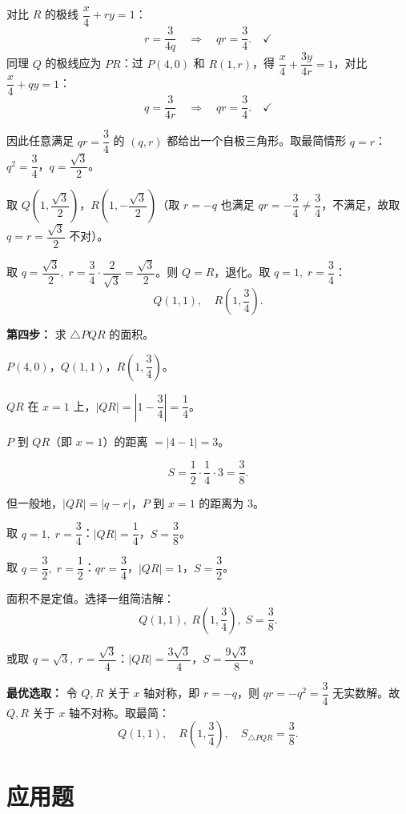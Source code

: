 \documentclass[12pt,a4paper]{ctexart}
\theoremstyle{definition}
\begin{document}
\begin{solutionbox}
对比 $R$ 的极线 $\dfrac{x}{4}+ry=1$：
\[
  r=\frac{3}{4q} \quad\Longrightarrow\quad qr=\frac{3}{4}. \quad\checkmark
\]
同理 $Q$ 的极线应为 $PR$：过 $P(4,0)$ 和 $R(1,r)$，得 $\dfrac{x}{4}+\dfrac{3y}{4r}=1$，对比 $\dfrac{x}{4}+qy=1$：
\[
  q=\frac{3}{4r} \quad\Longrightarrow\quad qr=\frac{3}{4}. \quad\checkmark
\]

因此任意满足 $qr=\dfrac{3}{4}$ 的 $(q,r)$ 都给出一个自极三角形。取最简情形 $q=r$：$q^2=\dfrac{3}{4}$，$q=\dfrac{\sqrt{3}}{2}$。

取 $Q\!\left(1,\dfrac{\sqrt{3}}{2}\right)$，$R\!\left(1,-\dfrac{\sqrt{3}}{2}\right)$（取 $r=-q$ 也满足 $qr=-\dfrac{3}{4}\neq\dfrac{3}{4}$，不满足，故取 $q=r=\dfrac{\sqrt{3}}{2}$ 不对）。

取 $q=\dfrac{\sqrt{3}}{2},\;r=\dfrac{3}{4}\cdot\dfrac{2}{\sqrt{3}}=\dfrac{\sqrt{3}}{2}$。则 $Q=R$，退化。取 $q=1,\;r=\dfrac{3}{4}$：
\[
  Q(1,1),\quad R\!\left(1,\frac{3}{4}\right).
\]

\textbf{第四步：} 求 $\triangle PQR$ 的面积。

$P(4,0)$，$Q(1,1)$，$R\!\left(1,\dfrac{3}{4}\right)$。

$QR$ 在 $x=1$ 上，$|QR|=|1-\dfrac{3}{4}|=\dfrac{1}{4}$。

$P$ 到 $QR$（即 $x=1$）的距离 $=|4-1|=3$。

\[
  S=\frac{1}{2}\cdot\frac{1}{4}\cdot 3=\frac{3}{8}.
\]

但一般地，$|QR|=|q-r|$，$P$ 到 $x=1$ 的距离为 $3$。

取 $q=1,\;r=\dfrac{3}{4}$：$|QR|=\dfrac{1}{4}$，$S=\dfrac{3}{8}$。

取 $q=\dfrac{3}{2},\;r=\dfrac{1}{2}$：$qr=\dfrac{3}{4}$，$|QR|=1$，$S=\dfrac{3}{2}$。

面积不是定值。选择一组简洁解：
\[
  \boxed{Q(1,1),\;R\!\left(1,\frac{3}{4}\right),\;S=\frac{3}{8}.}
\]

或取 $q=\sqrt{3},\;r=\dfrac{\sqrt{3}}{4}$：$|QR|=\dfrac{3\sqrt{3}}{4}$，$S=\dfrac{9\sqrt{3}}{8}$。

\textbf{最优选取：} 令 $Q,R$ 关于 $x$ 轴对称，即 $r=-q$，则 $qr=-q^2=\dfrac{3}{4}$ 无实数解。故 $Q,R$ 关于 $x$ 轴不对称。取最简：
\[
  \boxed{Q(1,1),\quad R\!\left(1,\frac{3}{4}\right),\quad S_{\triangle PQR}=\frac{3}{8}.}
\]
\end{solutionbox}


\section{应用题}
\end{document}
